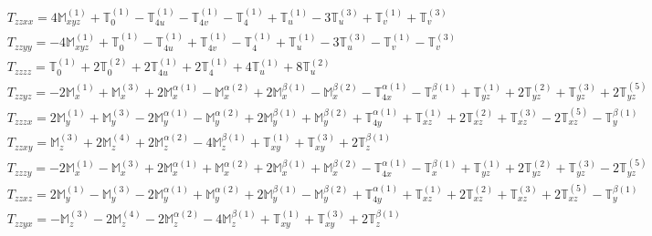 \documentclass[fleqn,8pt,landscape]{jsarticle}
\begin{document}
\begin{align*}
& T_{zzxx} = 4 \mathbb{M}_{xyz}^{(1)} + \mathbb{T}_{0}^{(1)} - \mathbb{T}_{4u}^{(1)} - \mathbb{T}_{4v}^{(1)} - \mathbb{T}_{4}^{(1)} + \mathbb{T}_{u}^{(1)} - 3 \mathbb{T}_{u}^{(3)} + \mathbb{T}_{v}^{(1)} + \mathbb{T}_{v}^{(3)} \\
& T_{zzyy} = - 4 \mathbb{M}_{xyz}^{(1)} + \mathbb{T}_{0}^{(1)} - \mathbb{T}_{4u}^{(1)} + \mathbb{T}_{4v}^{(1)} - \mathbb{T}_{4}^{(1)} + \mathbb{T}_{u}^{(1)} - 3 \mathbb{T}_{u}^{(3)} - \mathbb{T}_{v}^{(1)} - \mathbb{T}_{v}^{(3)} \\
& T_{zzzz} = \mathbb{T}_{0}^{(1)} + 2 \mathbb{T}_{0}^{(2)} + 2 \mathbb{T}_{4u}^{(1)} + 2 \mathbb{T}_{4}^{(1)} + 4 \mathbb{T}_{u}^{(1)} + 8 \mathbb{T}_{u}^{(2)} \\
& T_{zzyz} = - 2 \mathbb{M}_{x}^{(1)} + \mathbb{M}_{x}^{(3)} + 2 \mathbb{M}_{x}^{\alpha(1)} - \mathbb{M}_{x}^{\alpha(2)} + 2 \mathbb{M}_{x}^{\beta(1)} - \mathbb{M}_{x}^{\beta(2)} - \mathbb{T}_{4x}^{\alpha(1)} - \mathbb{T}_{x}^{\beta(1)} + \mathbb{T}_{yz}^{(1)} + 2 \mathbb{T}_{yz}^{(2)} + \mathbb{T}_{yz}^{(3)} + 2 \mathbb{T}_{yz}^{(5)} \\
& T_{zzzx} = 2 \mathbb{M}_{y}^{(1)} + \mathbb{M}_{y}^{(3)} - 2 \mathbb{M}_{y}^{\alpha(1)} - \mathbb{M}_{y}^{\alpha(2)} + 2 \mathbb{M}_{y}^{\beta(1)} + \mathbb{M}_{y}^{\beta(2)} + \mathbb{T}_{4y}^{\alpha(1)} + \mathbb{T}_{xz}^{(1)} + 2 \mathbb{T}_{xz}^{(2)} + \mathbb{T}_{xz}^{(3)} - 2 \mathbb{T}_{xz}^{(5)} - \mathbb{T}_{y}^{\beta(1)} \\
& T_{zzxy} = \mathbb{M}_{z}^{(3)} + 2 \mathbb{M}_{z}^{(4)} + 2 \mathbb{M}_{z}^{\alpha(2)} - 4 \mathbb{M}_{z}^{\beta(1)} + \mathbb{T}_{xy}^{(1)} + \mathbb{T}_{xy}^{(3)} + 2 \mathbb{T}_{z}^{\beta(1)} \\
& T_{zzzy} = - 2 \mathbb{M}_{x}^{(1)} - \mathbb{M}_{x}^{(3)} + 2 \mathbb{M}_{x}^{\alpha(1)} + \mathbb{M}_{x}^{\alpha(2)} + 2 \mathbb{M}_{x}^{\beta(1)} + \mathbb{M}_{x}^{\beta(2)} - \mathbb{T}_{4x}^{\alpha(1)} - \mathbb{T}_{x}^{\beta(1)} + \mathbb{T}_{yz}^{(1)} + 2 \mathbb{T}_{yz}^{(2)} + \mathbb{T}_{yz}^{(3)} - 2 \mathbb{T}_{yz}^{(5)} \\
& T_{zzxz} = 2 \mathbb{M}_{y}^{(1)} - \mathbb{M}_{y}^{(3)} - 2 \mathbb{M}_{y}^{\alpha(1)} + \mathbb{M}_{y}^{\alpha(2)} + 2 \mathbb{M}_{y}^{\beta(1)} - \mathbb{M}_{y}^{\beta(2)} + \mathbb{T}_{4y}^{\alpha(1)} + \mathbb{T}_{xz}^{(1)} + 2 \mathbb{T}_{xz}^{(2)} + \mathbb{T}_{xz}^{(3)} + 2 \mathbb{T}_{xz}^{(5)} - \mathbb{T}_{y}^{\beta(1)} \\
& T_{zzyx} = - \mathbb{M}_{z}^{(3)} - 2 \mathbb{M}_{z}^{(4)} - 2 \mathbb{M}_{z}^{\alpha(2)} - 4 \mathbb{M}_{z}^{\beta(1)} + \mathbb{T}_{xy}^{(1)} + \mathbb{T}_{xy}^{(3)} + 2 \mathbb{T}_{z}^{\beta(1)} \\

\end{align*}
\end{document}
